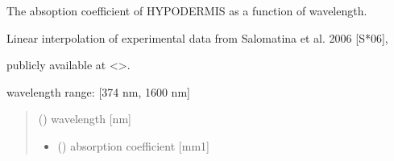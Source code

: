 \documentclass[letterpaper,10pt,english]{sphinxmanual}
\begin{document}
\begin{fulllineitems}
\label{\detokenize{03_absorption_coefficient:skinoptics.absorption_coefficient.mua_HY_Salomatina}}
\pysigstartsignatures
{}
\pysigstopsignatures
\begin{DUlineblock}{0em}
\item[] The absoption coefficient of HYPODERMIS as a function of wavelength.
\item[] Linear interpolation of experimental data from Salomatina et al. 2006 {[}S*06{]},
\item[] publicly available at \textless{}\textgreater{}.
\end{DUlineblock}

\begin{DUlineblock}{0em}
\item[] wavelength range: {[}374 nm, 1600 nm{]}
\end{DUlineblock}
\begin{quote}\begin{description}
\sphinxAtStartPar
{} () \textendash{} wavelength {[}nm{]}

\sphinxAtStartPar
\begin{itemize}
\item {} 
\sphinxAtStartPar
{} () \textendash{} absorption coefficient {[}mm\sphinxhyphen{}1{]}

\end{itemize}


\end{description}\end{quote}

\end{fulllineitems}

\end{document}
